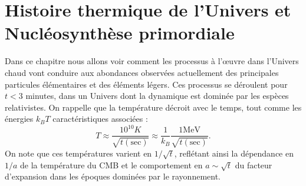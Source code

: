 
\chapter{Histoire thermique de l'Univers et Nucléosynthèse primordiale}

Dans ce chapitre nous allons voir comment les processus à l'œuvre dans l'Univers chaud vont conduire aux abondances observées actuellement des principales particules élémentaires et des éléments légers. Ces processus se déroulent pour $t<3$ minutes, dans un Univers dont la dynamique est dominée par les espèces relativistes. On rappelle que la température décroit avec le temps, tout comme les énergies $k_B T$ caractéristiques associées  :
\begin{equation}
T\approx\frac{10^{10} K}{\sqrt{t\mathrm{(sec)}}} \approx \frac{1}{k_B}\frac{1 \mathrm{MeV}}{\sqrt{t\mathrm{(sec)}}}.
\end{equation}
On note que ces températures varient en $1/\sqrt{t}$, reflétant ainsi la dépendance en $1/a$ de la température du CMB et le comportement en $a\sim \sqrt{t}$ du facteur d'expansion dans les époques dominées par le rayonnement.
 

